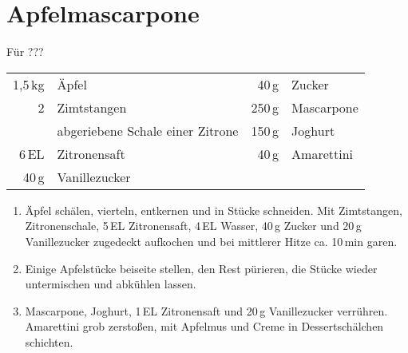 \section*{Apfelmascarpone}
\begin{centering}
F\"{u}r ???
\end{centering}
\begin{table}[H]
\centering
\begin{tabular*}{1\textwidth}{rlrl}
1,5\,kg & \"{A}pfel & 40\,g & Zucker \\
2 & Zimtstangen & 250\,g & Mascarpone \\
& abgeriebene Schale einer Zitrone & 150\,g & Joghurt \\
6\,EL & Zitronensaft & 40\,g & Amarettini \\
40\,g & Vanillezucker & & \\
\end{tabular*}
\end{table}
\begin{enumerate}

\item \"{A}pfel sch\"{a}len, vierteln, entkernen und in St\"{u}cke schneiden. Mit Zimtstangen, Zitronenschale, 5\,EL Zitronensaft, 4\,EL Wasser, 40\,g Zucker und 20\,g Vanillezucker zugedeckt aufkochen und bei mittlerer Hitze ca. 10\,min garen.

\item Einige Apfelst\"{u}cke beiseite stellen, den Rest p\"{u}rieren, die St\"{u}cke wieder untermischen und abk\"{u}hlen lassen.

\item Mascarpone, Joghurt, 1\,EL Zitronensaft und 20\,g Vanillezucker verrühren. Amarettini grob zerstoßen, mit Apfelmus und Creme in Dessertschälchen schichten.

\end{enumerate}
